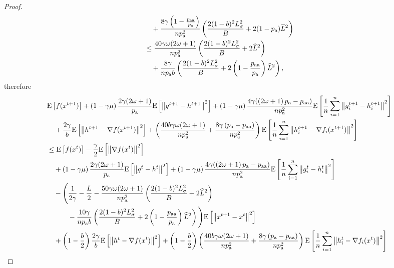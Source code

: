 \documentclass{article}
\newcommand*{\probavailable}{\ensuremath{p_{\textnormal{a}}}}
\newcommand*{\probpairaa}{\ensuremath{p_{\textnormal{aa}}}}
\begin{document}
\begin{proof}
\begin{align*}
        &\quad + \frac{8 \gamma \left(1 - \frac{\probpairaa}{\probavailable}\right)}{n \probavailable^2} \left(\frac{2 (1 - b)^2 L_{\sigma}^2}{B} + 2(1 - \probavailable) \widehat{L}^2\right) \\
        &\leq \frac{40 \gamma \omega (2 \omega + 1)}{n \probavailable^2} \left(\frac{2 (1 - b)^2 L_{\sigma}^2}{B} + 2 \widehat{L}^2\right) \\
        &\quad + \frac{8 \gamma}{n \probavailable b} \left(\frac{2 (1 - b)^2 L_{\sigma}^2}{B} + 2\left(1 - \frac{\probpairaa}{\probavailable}\right) \widehat{L}^2\right),
      \end{align*}
      therefore
      \begin{align*}
        &\Exp{f(x^{t + 1})} + \left(1 - \gamma \mu\right)\frac{2\gamma (2 \omega + 1)}{\probavailable} \Exp{\norm{g^{t+1} - h^{t+1}}^2} + \left(1 - \gamma \mu\right)\frac{4\gamma (\left(2 \omega + 1\right)\probavailable - \probpairaa)}{n \probavailable^2} \Exp{\frac{1}{n}\sum_{i=1}^n\norm{g^{t+1}_i - h^{t+1}_i}^2}\\
        &\quad  + \frac{2\gamma}{b} \Exp{\norm{h^{t+1} - \nabla f(x^{t+1})}^2} + \left(\frac{40 b \gamma \omega (2 \omega + 1)}{n \probavailable^2} + \frac{8 \gamma \left(\probavailable - \probpairaa\right)}{n \probavailable^2}\right) \Exp{\frac{1}{n}\sum_{i=1}^n\norm{h^{t+1}_i - \nabla f_i(x^{t+1})}^2}\\
        &\leq \Exp{f(x^t)} - \frac{\gamma}{2}\Exp{\norm{\nabla f(x^t)}^2} \\
        &\quad + \left(1 - \gamma \mu\right)\frac{2\gamma (2 \omega + 1)}{\probavailable} \Exp{\norm{g^{t} - h^{t}}^2} + \left(1 - \gamma \mu\right)\frac{4\gamma (\left(2 \omega + 1\right)\probavailable - \probpairaa)}{n \probavailable^2} \Exp{\frac{1}{n}\sum_{i=1}^n\norm{g^{t}_i - h^{t}_i}^2} \\
        &\quad - \Bigg(\frac{1}{2\gamma} - \frac{L}{2} - \frac{50 \gamma \omega (2 \omega + 1)}{n \probavailable^2} \left(\frac{2 (1 - b)^2 L_{\sigma}^2}{B} + 2 \widehat{L}^2\right) \\
        &\qquad\quad - \frac{10 \gamma}{n \probavailable b}\left(\frac{2 (1 - b)^2 L_{\sigma}^2}{B} + 2\left(1 - \frac{\probpairaa}{\probavailable}\right) \widehat{L}^2 \right)\Bigg) \Exp{\norm{x^{t+1} - x^t}^2} \\
        &\quad + \left(1 - \frac{b}{2}\right)\frac{2\gamma}{b} \Exp{\norm{h^{t} - \nabla f(x^{t})}^2} + \left(1 - \frac{b}{2}\right)\left(\frac{40 b \gamma \omega (2 \omega + 1)}{n \probavailable^2} + \frac{8 \gamma \left(\probavailable - \probpairaa\right)}{n \probavailable^2}\right)\Exp{\frac{1}{n}\sum_{i=1}^n\norm{h^{t}_i - \nabla f_i(x^{t})}^2} \\

\end{align*}
\end{proof}
\end{document}

